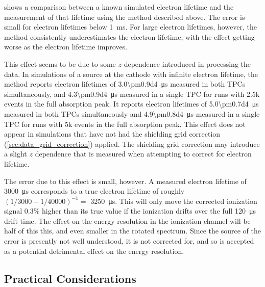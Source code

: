 \documentclass[herrin-thesis.tex]{subfiles}
\begin{document}
 shows a comparison between a known simulated electron lifetime and the measurement of that lifetime using the method described above. The error is small for electron lifetimes below \SI{1}{\ms}. For large electron lifetimes, however, the method consistently underestimates the electron lifetime, with the effect getting worse as the electron lifetime improves. 

This effect seems to be due to some \(z\)-dependence introduced in processing the data. In simulations of a  source at the cathode with infinite electron lifetime, the method reports electron lifetimes of \SI{3.0\pm0.9d4}{\micro\second} measured in both TPCs simultaneously, and \SI{4.3\pm0.9d4}{\micro\second} measured in a single TPC for runs with 2.5k events in the full absorption peak. It reports electron lifetimes of \SI{5.0\pm0.7d4}{\micro\second} measured in both TPCs simultaneously and \SI{4.9\pm0.8d4}{\micro\second} measured in a single TPC for runs with 5k events in the full absorption peak. This effect does not appear in simulations that have not had the shielding grid correction (\cref{sec:data_grid_correction}) applied. The shielding grid correction may introduce a slight \(z\) dependence that is measured when attempting to correct for electron lifetime.

The error due to this effect is small, however. A measured electron lifetime of \SI{3000}{\micro\second} corresponds to a true electron lifetime of roughly \((1/3000-1/40000)^{-1} =\) \SI{3250}{\micro\second}. This will only move the corrected ionization signal 0.3\% higher than its true value if the ionization drifts over the full \SI{120}{\micro\second} drift time. The effect on the energy resolution in the ionization channel will be half of this this, and even smaller in the rotated spectrum. Since the source of the error is presently not well understood, it is not corrected for, and so is accepted as a potential detrimental effect on the energy resolution.

\subsection{Practical Considerations}
\label{sec:el_practical_considerations}
\end{document}
